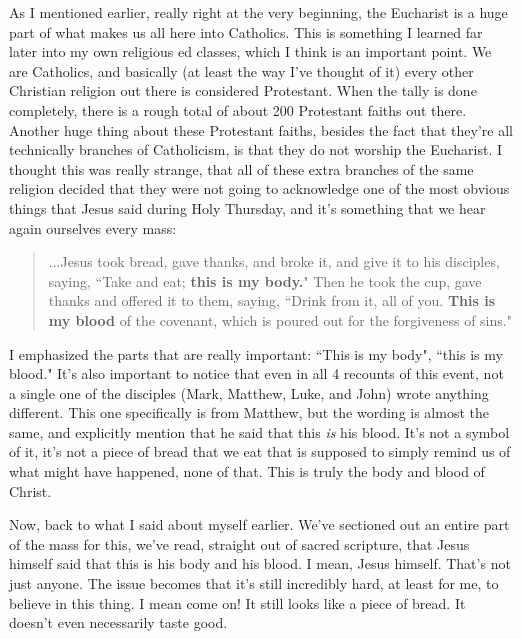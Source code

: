 \documentclass[12pt]{article}
\begin{document}
    As I mentioned earlier, really right at the very beginning, the Eucharist is a huge part of what makes us all here
    into Catholics. This is something I learned far later into my own religious ed classes, which I think is an important
    point. We are Catholics, and basically (at least the way I've thought of it) every other Christian religion out there
    is considered Protestant. When the tally is done completely, there is a rough total of about 200 Protestant faiths
    out there. Another huge thing about these Protestant faiths, besides the fact that they're all technically branches
    of Catholicism, is that they do not worship the Eucharist. I thought this was really strange, that all of these extra
    branches of the same religion decided that they were not going to acknowledge one of the most obvious things that
    Jesus said during Holy Thursday, and it's something that we hear again ourselves every mass:
    \begin{quote}
      ...Jesus took bread, gave thanks, and broke it, and give it to his disciples, saying, ``Take and eat; \textbf{this is my body.}"
      Then he took the cup, gave thanks and offered it to them, saying, ``Drink from it, all of you. \textbf{This is my blood} of the
      covenant, which is poured out for the forgiveness of sins."
    \end{quote}
    I emphasized the parts that are really important: ``This is my body", ``this is my blood." It's also important to notice
    that even in all 4 recounts of this event, not a single one of the disciples (Mark, Matthew, Luke, and John) wrote
    anything different. This one specifically is from Matthew, but the wording is almost the same, and explicitly mention
    that he said that this \textit{is} his blood. It's not a symbol of it, it's not a piece of bread that we eat that is 
    supposed to simply remind us of what might have happened, none of that. This is truly the body and blood of Christ.

    Now, back to what I said about myself earlier. We've sectioned out an entire part of the mass for this, we've read,
    straight out of sacred scripture, that Jesus himself said that this is his body and his blood. I mean, Jesus himself.
    That's not just anyone. The issue becomes that it's still incredibly hard, at least for me, to believe in this thing.
    I mean come on! It still looks like a piece of bread. It doesn't even necessarily taste good.
\end{document}
